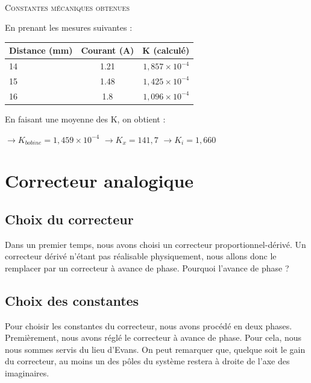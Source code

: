 \documentclass[11pt, french]{article} %
\begin{document}
\paragraph{}
\textsc{Constantes mécaniques obtenues }

En prenant les mesures suivantes :

\medskip
\begin{tabular} {|l|c|r|}
	 \hline
	\textbf{Distance (mm)} & \textbf{Courant (A)} & \textbf{K (calculé)} \\ \hline
	14 & 1.21 & $ 1,857 \times 10^{-4} $ \\ \hline
	15 & 1.48 & $ 1,425  \times 10^{-4} $ \\ \hline
	16 & 1.8 & $ 1,096  \times 10^{-4} $ \\ \hline
\end{tabular}

\medskip
\noindent
En faisant une moyenne des K, on obtient :

\medskip
$ \rightarrow K_{bobine} = 1,459 \times 10^{-4} $
$ \rightarrow K_x = 141,7 $
$ \rightarrow K_i = 1,660 $

\section{Correcteur analogique}
\subsection{Choix du correcteur}
Dans un premier temps, nous avons choisi un correcteur proportionnel-dérivé. Un correcteur dérivé n'étant pas réalisable physiquement, nous allons donc le remplacer par un correcteur à avance de phase.
\medskip
Pourquoi l'avance de phase ?

\medskip


\subsection{Choix des constantes}

Pour choisir les constantes du correcteur, nous avons procédé en deux phases. Premièrement, nous avons réglé le correcteur à avance de phase. Pour cela, nous nous sommes servis du lieu d'Evans. On peut remarquer que, quelque soit le gain du correcteur, au moins un des pôles du système restera à droite de l'axe des imaginaires.
\end{document}
